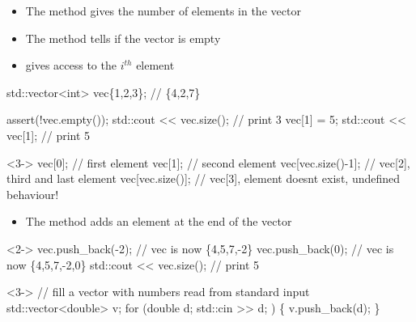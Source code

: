 \begin{frame}[fragile]{ \insertcontinuationtext}

  \begin{itemize}
  \item The  method gives the number of elements in the vector
  \item The  method tells if the vector is empty
  \item {} gives access to the $i^{th}$ element
  \end{itemize}

  \begin{codeblock}
std::vector<int> vec\{1,2,3\}; // \{4,2,7\}

assert(!vec.empty());
std::cout << vec.size(); // print 3
vec[1] = 5;              
std::cout << vec[1];     // print 5\end{codeblock}


  \begin{codeblock}<3->{
vec[0];            // first element
vec[1];            // second element
vec[vec.size()-1]; // vec[2], third and last element
vec[vec.size()];   // vec[3], element doesn\textquotesingle{}t exist, undefined behaviour!}\end{codeblock}

\end{frame}

\begin{frame}[fragile]{ \insertcontinuationtext}
  \begin{itemize}
  \item The  method adds an element at the end of the vector
  \end{itemize}

  \begin{codeblock}<2->{
vec.push_back(-2);       // vec is now \{4,5,7,-2\}
vec.push_back(0);        // vec is now \{4,5,7,-2,0\}
std::cout << vec.size(); // print 5}\end{codeblock}

    \begin{codeblock}<3->{
// fill a vector with numbers read from standard input
std::vector<double> v;
for (double d; std::cin >> d; ) \{
  v.push_back(d);
\}}\end{codeblock}

\end{frame}

